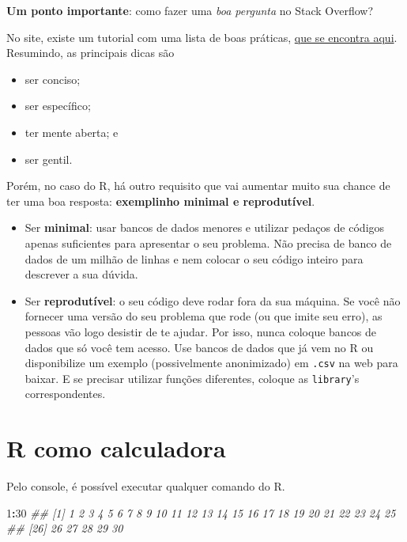 \documentclass[
]{book}
\newenvironment{Shaded}{\begin{snugshade}}{\end{snugshade}}
\newcommand{\CommentTok}[1]{\textcolor[rgb]{0.56,0.35,0.01}{\textit{#1}}}
\newcommand{\DecValTok}[1]{\textcolor[rgb]{0.00,0.00,0.81}{#1}}
\newcommand{\OperatorTok}[1]{\textcolor[rgb]{0.81,0.36,0.00}{\textbf{#1}}}
\providecommand{\tightlist}{%
  \setlength{\itemsep}{0pt}\setlength{\parskip}{0pt}}
\begin{document}
\textbf{Um ponto importante}: como fazer uma \emph{boa pergunta} no Stack Overflow?

No site, existe um tutorial com uma lista de boas práticas, \href{http://pt.stackoverflow.com/help/how-to-ask}{que se encontra aqui}. Resumindo, as principais dicas são

\begin{itemize}
\tightlist
\item
  ser conciso;
\item
  ser específico;
\item
  ter mente aberta; e
\item
  ser gentil.
\end{itemize}

Porém, no caso do R, há outro requisito que vai aumentar muito sua chance de ter uma boa resposta: \textbf{exemplinho minimal e reprodutível}.

\begin{itemize}
\item
  Ser \textbf{minimal}: usar bancos de dados menores e utilizar pedaços de códigos apenas suficientes para apresentar o seu problema. Não precisa de banco de dados de um milhão de linhas e nem colocar o seu código inteiro para descrever a sua dúvida.
\item
  Ser \textbf{reprodutível}: o seu código deve rodar fora da sua máquina. Se você não fornecer uma versão do seu problema que rode (ou que imite seu erro), as pessoas vão logo desistir de te ajudar. Por isso, nunca coloque bancos de dados que só você tem acesso. Use bancos de dados que já vem no R ou disponibilize um exemplo (possivelmente anonimizado) em \texttt{.csv} na web para baixar. E se precisar utilizar funções diferentes, coloque as \texttt{library}'s correspondentes.
\end{itemize}

\hypertarget{r-como-calculadora}{%
\section{R como calculadora}\label{r-como-calculadora}}

Pelo console, é possível executar qualquer comando do R.

\begin{Shaded}
\begin{Highlighting}[]
\DecValTok{1}\OperatorTok{:}\DecValTok{30}
\CommentTok{##  [1]  1  2  3  4  5  6  7  8  9 10 11 12 13 14 15 16 17 18 19 20 21 22 23 24 25}
\CommentTok{## [26] 26 27 28 29 30}
\end{Highlighting}
\end{Shaded}
\end{document}
